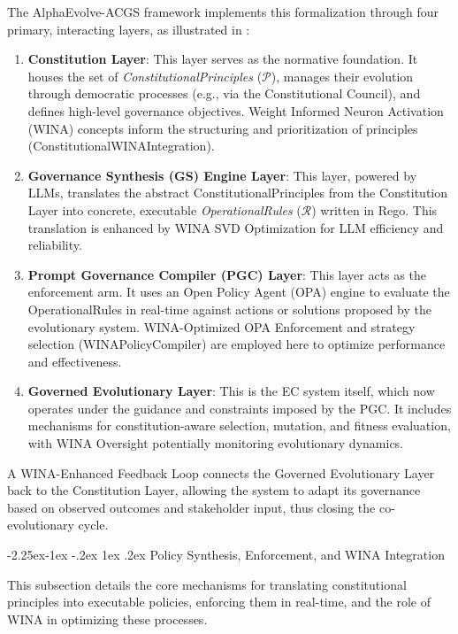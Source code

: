 \documentclass[manuscript,screen,review,anonymous,9pt]{acmart}
\makeatletter
\renewcommand\subsection{\@startsection{subsection}{2}{\z@}%
  {-2.25ex\@plus -1ex \@minus -.2ex}%
  {1ex \@plus .2ex}%
  {\normalfont\large\bfseries}}
\makeatother
\begin{document}
The AlphaEvolve-ACGS framework implements this formalization through four primary, interacting layers, as illustrated in :
\begin{enumerate}[leftmargin=*,itemsep=1pt,parsep=1pt]
    \item \textbf{Constitution Layer}: This layer serves as the normative foundation. It houses the set of \textit{ConstitutionalPrinciples} ($\mathcal{P}$), manages their evolution through democratic processes (e.g., via the Constitutional Council), and defines high-level governance objectives. Weight Informed Neuron Activation (WINA) concepts inform the structuring and prioritization of principles (ConstitutionalWINAIntegration).
    \item \textbf{Governance Synthesis (GS) Engine Layer}: This layer, powered by LLMs, translates the abstract ConstitutionalPrinciples from the Constitution Layer into concrete, executable \textit{OperationalRules} ($\mathcal{R}$) written in Rego. This translation is enhanced by WINA SVD Optimization for LLM efficiency and reliability.
    \item \textbf{Prompt Governance Compiler (PGC) Layer}: This layer acts as the enforcement arm. It uses an Open Policy Agent (OPA) engine to evaluate the OperationalRules in real-time against actions or solutions proposed by the evolutionary system. WINA-Optimized OPA Enforcement and strategy selection (WINAPolicyCompiler) are employed here to optimize performance and effectiveness.
    \item \textbf{Governed Evolutionary Layer}: This is the EC system itself, which now operates under the guidance and constraints imposed by the PGC. It includes mechanisms for constitution-aware selection, mutation, and fitness evaluation, with WINA Oversight potentially monitoring evolutionary dynamics.
\end{enumerate}
A WINA-Enhanced Feedback Loop connects the Governed Evolutionary Layer back to the Constitution Layer, allowing the system to adapt its governance based on observed outcomes and stakeholder input, thus closing the co-evolutionary cycle.

\subsection{Policy Synthesis, Enforcement, and WINA Integration}
\label{subsec:policy_synthesis_enforcement} 

This subsection details the core mechanisms for translating constitutional principles into executable policies, enforcing them in real-time, and the role of WINA in optimizing these processes.
\end{document}
